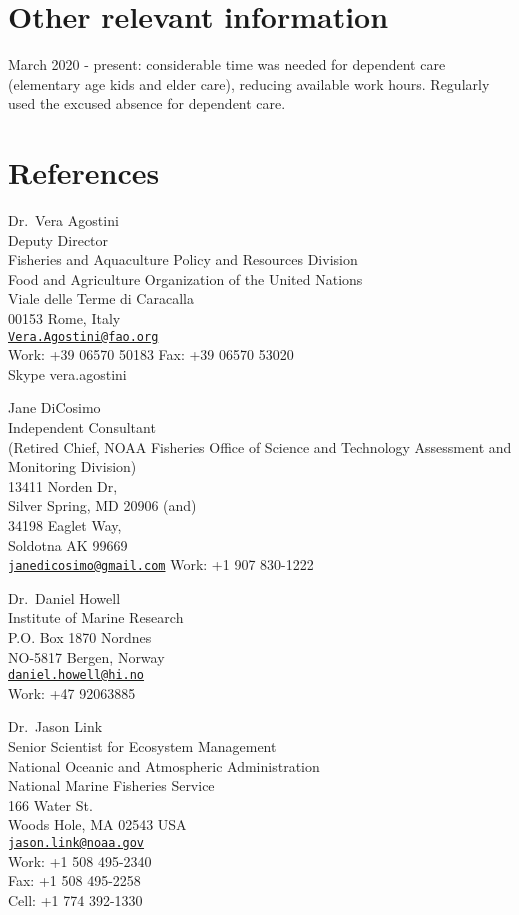 \documentclass[11pt, a4paper]{awesome-cv}
\begin{document}
\hypertarget{other-relevant-information}{%
\section{Other relevant information}\label{other-relevant-information}}

March 2020 - present: considerable time was needed for dependent care
(elementary age kids and elder care), reducing available work hours.
Regularly used the excused absence for dependent care.

\hypertarget{references}{%
\section{References}\label{references}}

Dr.~Vera Agostini\\
Deputy Director\\
Fisheries and Aquaculture Policy and Resources Division\\
Food and Agriculture Organization of the United Nations\\
Viale delle Terme di Caracalla\\
00153 Rome, Italy\\
\href{mailto:Vera.Agostini@fao.org}{\nolinkurl{Vera.Agostini@fao.org}}\\
Work: +39 06570 50183 Fax: +39 06570 53020\\
Skype vera.agostini

Jane DiCosimo\\
Independent Consultant\\
(Retired Chief, NOAA Fisheries Office of Science and Technology
Assessment and Monitoring Division)\\
13411 Norden Dr,\\
Silver Spring, MD 20906 (and)\\
34198 Eaglet Way,\\
Soldotna AK 99669\\
\href{mailto:janedicosimo@gmail.com}{\nolinkurl{janedicosimo@gmail.com}}
Work: +1 907 830-1222

Dr.~Daniel Howell\\
Institute of Marine Research\\
P.O. Box 1870 Nordnes\\
NO-5817 Bergen, Norway\\
\href{mailto:daniel.howell@hi.no}{\nolinkurl{daniel.howell@hi.no}}\\
Work: +47 92063885

Dr.~Jason Link\\
Senior Scientist for Ecosystem Management\\
National Oceanic and Atmospheric Administration\\
National Marine Fisheries Service\\
166 Water St.\\
Woods Hole, MA 02543 USA\\
\href{mailto:jason.link@noaa.gov}{\nolinkurl{jason.link@noaa.gov}}\\
Work: +1 508 495-2340\\
Fax: +1 508 495-2258\\
Cell: +1 774 392-1330
\end{document}
